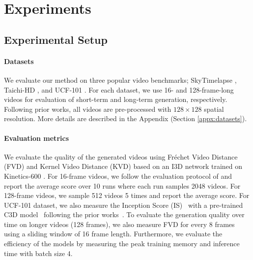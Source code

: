 \documentclass[10pt,twocolumn,letterpaper]{article}
\newcommand{\cutsubsectiondown}{\vspace*{-0.07in}}
\newcommand{\cutparagraphup}{\vspace*{-0.1in}}
\begin{document}
\iffalse
\begin{figure}[h]
    \centering
\vspace{1cm}
    {\color{blue} Short figure on Video Editing (Sky-timelapse)} 
    \vspace{1cm}
    \caption{Caption}
    \label{fig:long_samples}
\end{figure}
\fi

\section{Experiments}
\label{sec:experiments}


\subsection{Experimental Setup}
\cutsubsectiondown
\paragraph{Datasets}
We evaluate our method on three popular video benchmarks; SkyTimelapse \cite{stl}, Taichi-HD \cite{taichi}, and UCF-101 \cite{ucf}.
For each dataset, we use 16- and 128-frame-long videos for evaluation of short-term and long-term generation, respectively.
Following prior works, all videos are pre-processed with $128\times128$ spatial resolution.
More details are described in the Appendix (Section \ref{appx:datasets}).


\cutparagraphup
\paragraph{Evaluation metrics}
We evaluate the quality of the generated videos using Fréchet Video Distance (FVD) \cite{FVD} and Kernel Video Distance (KVD) \cite{FVD} based on an I3D network trained on Kinetics-600 \cite{kinetics}. 
For 16-frame videos, we follow the evaluation protocol of \cite{TGANv2} and report the average score over 10 runs where each run samples 2048 videos.
For 128-frame videos, we sample 512 videos 5 times and report the average score.
For UCF-101 dataset, we also measure the Inception Score (IS)~\cite{IS} with a pre-trained C3D model~\cite{c3d} following the prior works~\cite{TATS, CCVS, VGAN}. 
To evaluate the generation quality over time on longer videos (128 frames), we also measure FVD for every 8 frames using a sliding window of 16 frame length.
Furthermore, we evaluate the efficiency of the models by measuring the peak training memory and inference time with batch size 4.
\end{document}
